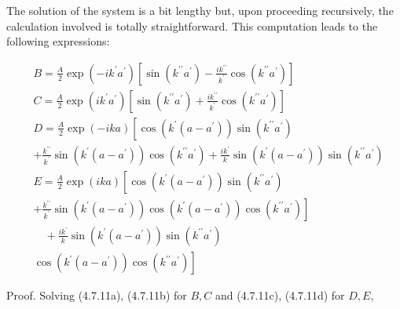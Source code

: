 \documentclass{article}
\begin{document}
The solution of the system is a bit lengthy but, upon proceeding recursively, the calculation involved is totally straightforward. This computation leads to the following expressions:
 
\begin{align*}
& B= \frac{A}{2} \exp \left(-i k^{\prime} a^{\prime}\right)\left[\sin \left(k^{\prime \prime} a^{\prime}\right)-\frac{i k^{\prime \prime}}{k^{\prime}} \cos \left(k^{\prime \prime} a^{\prime}\right)\right]  \tag{4.7.13a}\\
& C= \frac{A}{2} \exp \left(i k^{\prime} a^{\prime}\right)\left[\sin \left(k^{\prime \prime} a^{\prime}\right)+\frac{i k^{\prime \prime}}{k^{\prime}} \cos \left(k^{\prime \prime} a^{\prime}\right)\right]  \tag{4.7.13b}\\
& D= \frac{A}{2} \exp (-i k a)\left[\cos \left(k^{\prime}\left(a-a^{\prime}\right)\right) \sin \left(k^{\prime \prime} a^{\prime}\right)\right.  \tag{4.7.13c}\\
&+\frac{k^{\prime \prime}}{k^{\prime}} \sin \left(k^{\prime}\left(a-a^{\prime}\right)\right) \cos \left(k^{\prime \prime} a^{\prime}\right)+\frac{i k^{\prime}}{k} \sin \left(k^{\prime}\left(a-a^{\prime}\right)\right) \sin \left(k^{\prime \prime} a^{\prime}\right) \\
& E=\frac{A}{2} \exp (i k a)\left[\cos \left(k^{\prime}\left(a-a^{\prime}\right)\right) \sin \left(k^{\prime \prime} a^{\prime}\right)\right. \\
&\left.+\frac{k^{\prime \prime}}{k^{\prime}} \sin \left(k^{\prime}\left(a-a^{\prime}\right)\right) \cos \left(k^{\prime}\left(a-a^{\prime}\right)\right) \cos \left(k^{\prime \prime} a^{\prime}\right)\right]  \tag{4.7.13d}\\
& \quad+\frac{i k^{\prime}}{k} \sin \left(k^{\prime}\left(a-a^{\prime}\right)\right) \sin \left(k^{\prime \prime} a^{\prime}\right) \\
&\left.\cos \left(k^{\prime}\left(a-a^{\prime}\right)\right) \cos \left(k^{\prime \prime} a^{\prime}\right)\right]
\end{align*}
 

Proof. Solving (4.7.11a), (4.7.11b) for $B, C$ and (4.7.11c), (4.7.11d) for $D, E$,
 
\end{document}
